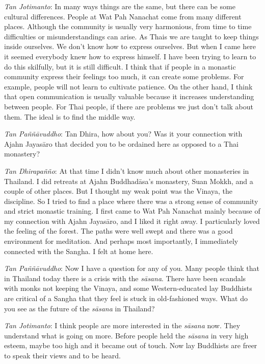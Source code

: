 \emph{Tan Jotimanto}: In many ways things are the same, but there can be
some cultural differences. People at Wat Pah Nanachat come from many
different places. Although the community is usually very harmonious,
from time to time difficulties or misunderstandings can arise. As Thais
we are taught to keep things inside ourselves. We don't know how to
express ourselves. But when I came here it seemed everybody knew how to
express himself. I have been trying to learn to do this skilfully, but
it is still difficult. I think that if people in a monastic community
express their feelings too much, it can create some problems. For
example, people will not learn to cultivate patience. On the other hand,
I think that open communication is usually valuable because it increases
understanding between people. For Thai people, if there are problems we
just don't talk about them. The ideal is to find the middle way.

\emph{Tan Paññāvuddho}‎: Tan Dhira, how about you? Was it your
connection with Ajahn Jayasāro that decided you to be ordained here as
opposed to a Thai monastery?

\emph{Tan Dhirapañño}‎: At that time I didn't know much about other
monasteries in Thailand. I did retreats at Ajahn Buddhadāsa's monastery,
Suan Mokkh, and a couple of other places. But I thought my weak point
was the Vinaya, the discipline. So I tried to find a place where there
was a strong sense of community and strict monastic training. I first
came to Wat Pah Nanachat mainly because of my connection with Ajahn
Jayasāro, and I liked it right away. I particularly loved the feeling of
the forest. The paths were well swept and there was a good environment
for meditation. And perhaps most importantly, I immediately connected
with the Sangha. I felt at home here.

\emph{Tan Paññāvuddho}‎: Now I have a question for any of you. Many
people think that in Thailand today there is a crisis with the
\emph{sāsana}. There have been scandals with monks not keeping the
Vinaya, and some Western-educated lay Buddhists are critical of a Sangha
that they feel is stuck in old-fashioned ways. What do you see as the
future of the \emph{sāsana} in Thailand?

\emph{Tan Jotimanto}: I think people are more interested in the
\emph{sāsana} now. They understand what is going on more. Before people
held the \emph{sāsana} in very high esteem, maybe too high and it became
out of touch. Now lay Buddhists are freer to speak their views and to be
heard.


